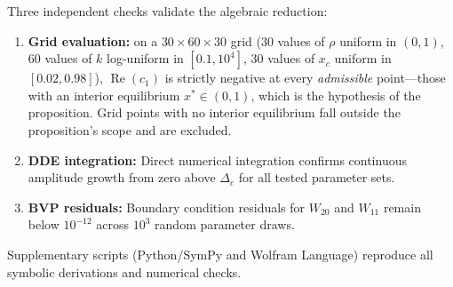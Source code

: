Three independent checks validate the algebraic reduction:
\begin{enumerate}
\item \textbf{Grid evaluation:} on a $30\times60\times30$ grid (30 values of $\rho$ uniform in $(0,1)$, 60 values of $k$ log-uniform in $[0.1,10^4]$, 30 values of $x_c$ uniform in $[0.02,0.98]$), $\operatorname{Re}(c_1)$ is strictly negative at every \emph{admissible} point---those with an interior equilibrium $x^*\in(0,1)$, which is the hypothesis of the proposition. Grid points with no interior equilibrium fall outside the proposition's scope and are excluded.
\item \textbf{DDE integration:} Direct numerical integration confirms continuous amplitude growth from zero above $\Delta_c$ for all tested parameter sets.
\item \textbf{BVP residuals:} Boundary condition residuals for $W_{20}$ and $W_{11}$ remain below $10^{-12}$ across $10^3$ random parameter draws.
\end{enumerate}
Supplementary scripts (Python/SymPy and Wolfram Language) reproduce all symbolic derivations and numerical checks.
